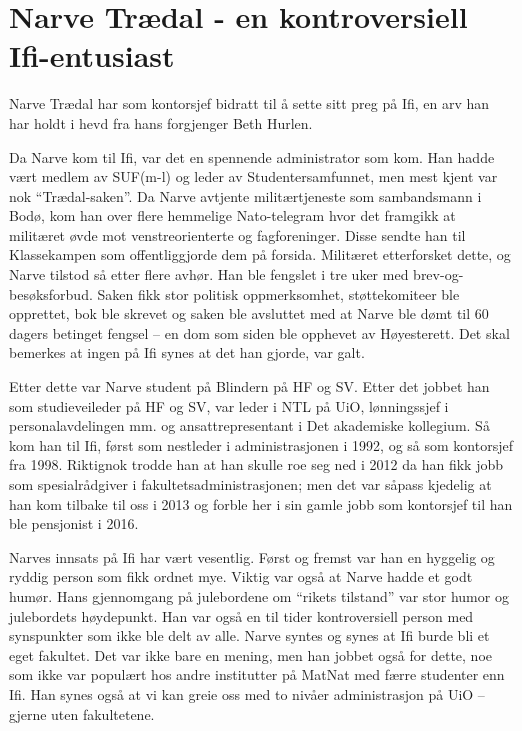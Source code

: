 \chapter{Narve Trædal - en kontroversiell Ifi-entusiast}

\author{Skrevet av Dag Langmyhr og Arne Maus}

Narve Trædal har som kontorsjef bidratt til å sette sitt preg på Ifi, en arv han har holdt i hevd fra hans forgjenger Beth Hurlen.

Da Narve kom til Ifi, var det en spennende administrator som kom. Han hadde vært medlem av SUF(m-l) og leder av Studentersamfunnet, men mest kjent var nok ``Trædal-saken''. Da Narve avtjente militærtjeneste som sambandsmann i Bodø, kom han over flere hemmelige Nato-telegram hvor det framgikk at militæret øvde mot venstreorienterte og fagforeninger. Disse sendte han til Klassekampen som offentliggjorde dem på forsida. Militæret etterforsket dette, og Narve tilstod så etter flere avhør. Han ble fengslet i tre uker med brev-og-besøksforbud. Saken fikk stor politisk oppmerksomhet, støttekomiteer ble opprettet, bok ble skrevet og saken ble avsluttet med at Narve ble dømt til 60 dagers betinget fengsel – en dom som siden ble opphevet av Høyesterett. Det skal bemerkes at ingen på Ifi synes at det han gjorde, var galt.

Etter dette var Narve student på Blindern på HF og SV. Etter det jobbet han som studieveileder på HF og SV, var leder i NTL på UiO, lønningssjef i personalavdelingen mm. og ansattrepresentant i Det akademiske kollegium. Så kom han til Ifi, først som nestleder i administrasjonen i 1992, og så som kontorsjef fra 1998. Riktignok trodde han at han skulle roe seg ned i 2012 da han fikk jobb som spesialrådgiver i fakultetsadministrasjonen; men det var såpass kjedelig at han kom tilbake til oss i 2013 og forble her i sin gamle jobb som kontorsjef til han ble pensjonist i 2016.

Narves innsats på Ifi har vært vesentlig. Først og fremst var han en hyggelig og ryddig person som fikk ordnet mye. Viktig var også at Narve hadde et godt humør. Hans gjennomgang på julebordene om ``rikets tilstand'' var stor humor og julebordets høydepunkt. Han var også en til tider kontroversiell person med synspunkter som ikke ble delt av alle. Narve syntes og synes at Ifi burde bli et eget fakultet. Det var ikke bare en mening, men han jobbet også for dette, noe som ikke var populært hos andre institutter på MatNat med færre studenter enn Ifi. Han synes også at vi kan greie oss med to nivåer administrasjon på UiO – gjerne uten fakultetene. 

